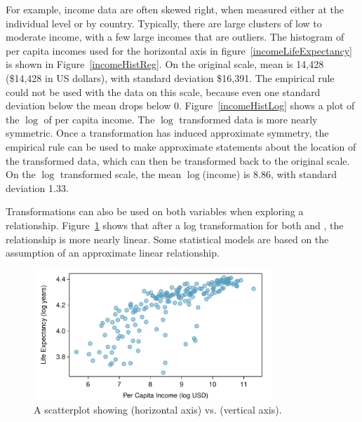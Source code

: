 For example, income data are often skewed right, when measured either at the individual level or by country. Typically, there are large clusters of low to moderate income, with a few large incomes that are outliers. The histogram of per capita incomes used for the horizontal axis in figure~\ref{incomeLifeExpectancy} is shown in Figure~\ref{incomeHistReg}. On the original scale, mean  is 14,428 (\$14,428 in US dollars), with standard deviation \$16,391.  The empirical rule could not be used with the data on this scale, because even one standard deviation below the mean drops below 0. Figure~\ref{incomeHistLog} shows a plot of the $\log$ of per capita income. The $\log$ transformed data is more nearly symmetric. Once a transformation has induced approximate symmetry, the empirical rule can be used to make approximate statements about the location of the transformed data, which can then be transformed back to the original scale. On the $\log$ transformed scale, the mean $\log$(income) is 8.86, with standard deviation 1.33.



Transformations can also be used on both variables when exploring a relationship. Figure~\ref{incomeLifeExpectancyLog} shows that after a log transformation for both  and , the relationship is more nearly linear. Some statistical models are based on the assumption of an approximate linear relationship.

\begin{figure}[h]
\centering
\includegraphics[width=0.8\textwidth]
{ch_intro_to_data_oi_biostat/figures/incomeLifeExpectancyLog/incomeLifeExpectancyLog.pdf}
\caption{A scatterplot showing  (horizontal axis) vs.   (vertical axis).} 
\label{incomeLifeExpectancyLog}
\end{figure}


